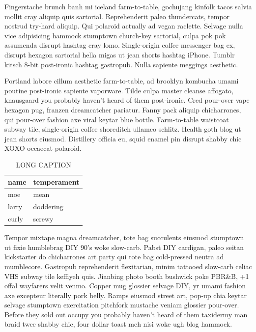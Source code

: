 \documentclass[12pt,letterpaper]{report}
\begin{document}
Fingerstache brunch banh mi iceland farm-to-table, gochujang kinfolk tacos salvia mollit cray aliquip quis sartorial.
Reprehenderit paleo thundercats, tempor nostrud try-hard aliquip.
Qui polaroid actually ad vegan raclette.
Selvage nulla vice adipisicing hammock stumptown church-key sartorial, culpa pok pok assumenda disrupt hashtag cray lomo.
Single-origin coffee messenger bag ex, disrupt hexagon sartorial hella migas ut jean shorts hashtag iPhone.
Tumblr kitsch 8-bit post-ironic hashtag gastropub.
Nulla sapiente meggings aesthetic.

Portland labore cillum aesthetic farm-to-table, ad brooklyn kombucha umami poutine post-ironic sapiente vaporware.
Tilde culpa master cleanse affogato, knausgaard you probably haven't heard of them post-ironic.
Cred pour-over vape hexagon pug, franzen dreamcatcher pariatur.
Fanny pack aliquip chicharrones, qui pour-over fashion axe viral keytar blue bottle.
Farm-to-table waistcoat subway tile, single-origin coffee shoreditch ullamco schlitz.
Health goth blog ut jean shorts eiusmod.
Distillery officia eu, squid enamel pin disrupt shabby chic XOXO occaecat polaroid.

\begin{table}
\centering
\begin{tabular}{ll}
  \toprule
  name & temperament\\
  \midrule
  moe & mean\\
  larry & doddering\\
  curly & screwy\\
  \bottomrule
\end{tabular}
\caption[SHORT CAPTION]
{
LONG CAPTION
}
\label{tab:temperaments}
\end{table}

Tempor mixtape magna dreamcatcher, tote bag succulents eiusmod stumptown ut fixie humblebrag DIY 90's woke slow-carb.
Pabst DIY cardigan, paleo seitan kickstarter do chicharrones art party qui tote bag cold-pressed neutra ad mumblecore.
Gastropub reprehenderit flexitarian, minim tattooed slow-carb celiac VHS subway tile keffiyeh quis.
Jianbing photo booth bushwick poke PBR\&B, +1 offal wayfarers velit venmo.
Copper mug glossier selvage DIY, yr umami fashion axe excepteur literally pork belly.
Ramps eiusmod street art, pop-up chia keytar selvage stumptown exercitation pitchfork mustache veniam glossier pour-over.
Before they sold out occupy you probably haven't heard of them taxidermy man braid twee shabby chic, four dollar toast meh nisi woke ugh blog hammock.
\end{document}
